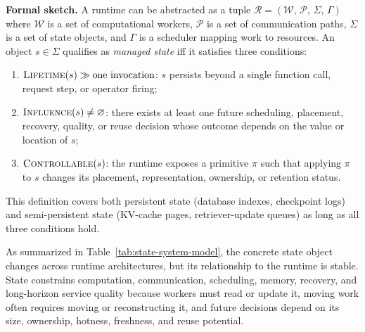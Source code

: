 ﻿\documentclass[manuscript]{acmart}
\begin{document}
\smallskip\noindent\textbf{Formal sketch.}
A runtime can be abstracted as a tuple \(\mathcal{R}=(\mathcal{W},\,\mathcal{P},\,\Sigma,\,\Gamma)\) where
\(\mathcal{W}\) is a set of computational workers,
\(\mathcal{P}\) is a set of communication paths,
\(\Sigma\) is a set of state objects, and
\(\Gamma\) is a scheduler mapping work to resources.
An object \(s\in\Sigma\) qualifies as \emph{managed state} iff it satisfies three conditions:
\begin{enumerate}[leftmargin=*,nosep]
\item \(\textsc{Lifetime}(s)\gg\text{one invocation}\): \(s\) persists beyond a single function call, request step, or operator firing;
\item \(\textsc{Influence}(s)\neq\varnothing\): there exists at least one future scheduling, placement, recovery, quality, or reuse decision whose outcome depends on the value or location of \(s\);
\item \(\textsc{Controllable}(s)\): the runtime exposes a primitive \(\pi\) such that applying \(\pi\) to \(s\) changes its placement, representation, ownership, or retention status.
\end{enumerate}
This definition covers both persistent state (database indexes, checkpoint logs) and semi-persistent state (KV-cache pages, retriever-update queues) as long as all three conditions hold.

As summarized in Table~\ref{tab:state-system-model}, the concrete state object changes across runtime architectures, but its relationship to the runtime is stable. State constrains computation, communication, scheduling, memory, recovery, and long-horizon service quality because workers must read or update it, moving work often requires moving or reconstructing it, and future decisions depend on its size, ownership, hotness, freshness, and reuse potential.
\end{document}
